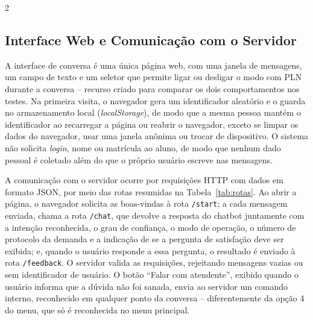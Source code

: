 \documentclass[10pt]{article}
\begin{document}
\begin{multicols}{2}

\subsection{Interface Web e Comunicação com o Servidor}\label{sec:api}

A interface de conversa é uma única página web, com uma janela de mensagens, um
campo de texto e um seletor que permite ligar ou desligar o modo com PLN
durante a conversa -- recurso criado para comparar os dois comportamentos nos
testes. Na primeira visita, o navegador gera um identificador aleatório e o guarda no armazenamento local (\textit{localStorage}), de modo que a mesma pessoa mantém o identificador ao recarregar a página ou reabrir o navegador, exceto se limpar os dados do navegador, usar uma janela anônima ou trocar de dispositivo. O sistema não solicita \textit{login}, nome ou
matrícula ao aluno, de modo que nenhum dado pessoal é coletado além do que o
próprio usuário escreve nas mensagens.

A comunicação com o servidor ocorre por requisições HTTP com dados em formato
JSON, por meio das rotas resumidas na Tabela~\ref{tab:rotas}. Ao abrir a
página, o navegador solicita as boas-vindas à rota \texttt{/start}; a cada
mensagem enviada, chama a rota \texttt{/chat}, que devolve a resposta do
chatbot juntamente com a intenção reconhecida, o grau de confiança, o modo de
operação, o número de protocolo da demanda e a indicação de se a pergunta de
satisfação deve ser exibida; e, quando o usuário responde a essa pergunta, o
resultado é enviado à rota \texttt{/feedback}. O servidor valida as
requisições, rejeitando mensagens vazias ou sem identificador de usuário. O
botão ``Falar com atendente'', exibido quando o usuário informa que a dúvida não
foi sanada, envia ao servidor um comando interno, reconhecido em qualquer ponto
da conversa -- diferentemente da opção 4 do menu, que só é reconhecida no menu
principal.

\end{multicols}
\end{document}
